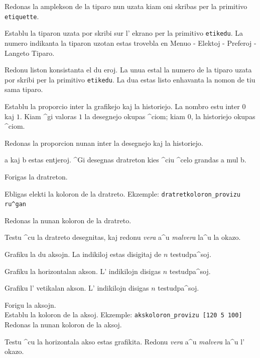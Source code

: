 Redonas la amplekson de la tiparo nun uzata kiam oni skribas per la 
primitivo \texttt{etiquette}.

Establu la tiparon uzata por skribi sur l' ekrano per la primitivo 
\texttt{etikedu}.  La numero indikanta la tiparon uzotan estas trovebla
en Menuo - Elektoj - Preferoj - Langeto Tiparo.

Redonu liston konsistanta el du eroj.  La unua estal la numero de la
tiparo uzata por skribi per la primitivo \texttt{etikedu}. 
La dua estas listo enhavanta la nomon de tiu sama tiparo.

Establu la proporcio inter la grafikejo kaj la historiejo.
La nombro estu inter $0$ kaj $1$.  Kiam ^gi valoras $1$
la desegnejo okupas ^ciom; kiam $0$, la historiejo okupas ^ciom.

Redonas la proporcion nunan inter la desegnejo kaj la historiejo.

a kaj b estas entjeroj.  ^Gi desegnas dratreton kies ^ciu ^celo
grandas a mul b.

Forigas la dratreton.

Ebligas elekti la koloron de la dratreto.
Ekzemple: \texttt{dratretkoloron\_provizu ru^gan}

Redonas la nunan koloron de la dratreto.

Testu ^cu la dratreto desegnitas, kaj redonu \emph{vera} a^u \emph{malvera} 
la^u la okazo.

Grafiku la du aksojn.  La indikiloj estas disigitaj de $n$ testudpa^soj.

Grafiku la horizontalan akson.  L' indikilojn disigas $n$ testudpa^soj.

Grafiku l' vetikalan akson.  L' indikilojn disigas $n$ testudpa^soj.

Forigu la aksojn.\\

Establu la koloron de la aksoj. Ekzemple: \texttt{akskoloron\_provizu
  [120 5 100]} \\

Redonas la nunan koloron de la aksoj.

Testu ^cu la horizontala akso estas grafikita.  Redonu \emph{vera}
a^u \emph{malvera} la^u l' okazo.

